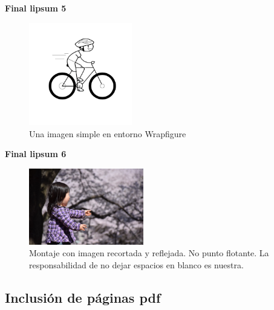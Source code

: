 \documentclass{article}
\begin{document}
{\bf Final lipsum 5}

\begin{figure}
 \includegraphics[trim= 0mm 15mm 0mm 8mm,clip,width=0.4\textwidth]{graficos/ciclista.png}
    \caption{Una imagen simple en entorno Wrapfigure}
    \label{Fig:5}
\end{figure}

\lipsum

{\bf Final lipsum 6}

\begin{figure}[H]  %
\centering
\includegraphics[trim = 50mm 0mm 190mm 40mm, clip,width=5cm]{./graficos/sorpresa}
\hspace{-0.35cm}
\caption{Montaje con imagen recortada y reflejada. No punto flotante. La responsabilidad de no dejar 
espacios en blanco es nuestra.}
\label{fig:6}
\end{figure}


\subsection{Inclusión de páginas pdf}



\end{document}
